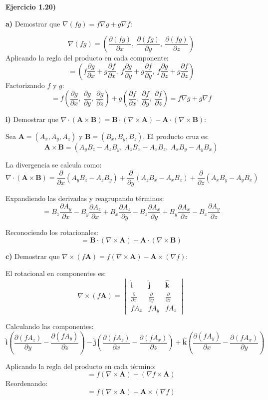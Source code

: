 \documentclass{article}
\begin{document}
\textbf{Ejercicio 1.20)}

\textbf{a)} Demostrar que \(\nabla(fg) = f\nabla g + g\nabla f\):

\[
\nabla(fg) = \left( \frac{\partial(fg)}{\partial x},\ \frac{\partial(fg)}{\partial y},\ \frac{\partial(fg)}{\partial z} \right)
\]
Aplicando la regla del producto en cada componente:
\[
= \left( f\frac{\partial g}{\partial x} + g\frac{\partial f}{\partial x},\ f\frac{\partial g}{\partial y} + g\frac{\partial f}{\partial y},\ f\frac{\partial g}{\partial z} + g\frac{\partial f}{\partial z} \right)
\]
Factorizando \(f\) y \(g\):
\[
= f\left( \frac{\partial g}{\partial x},\ \frac{\partial g}{\partial y},\ \frac{\partial g}{\partial z} \right) + g\left( \frac{\partial f}{\partial x},\ \frac{\partial f}{\partial y},\ \frac{\partial f}{\partial z} \right) = f\nabla g + g\nabla f
\]

\textbf{i)} Demostrar que \(\nabla \cdot (\mathbf{A} \times \mathbf{B}) = \mathbf{B} \cdot (\nabla \times \mathbf{A}) - \mathbf{A} \cdot (\nabla \times \mathbf{B})\):

Sea \(\mathbf{A} = (A_x, A_y, A_z)\) y \(\mathbf{B} = (B_x, B_y, B_z)\). El producto cruz es:
\[
\mathbf{A} \times \mathbf{B} = \left( A_y B_z - A_z B_y,\ A_z B_x - A_x B_z,\ A_x B_y - A_y B_x \right)
\]

La divergencia se calcula como:
\[
\nabla \cdot (\mathbf{A} \times \mathbf{B}) = \frac{\partial}{\partial x}(A_y B_z - A_z B_y) + \frac{\partial}{\partial y}(A_z B_x - A_x B_z) + \frac{\partial}{\partial z}(A_x B_y - A_y B_x)
\]

Expandiendo las derivadas y reagrupando términos:
\[
= B_z \frac{\partial A_y}{\partial x} - B_y \frac{\partial A_z}{\partial x} + B_x \frac{\partial A_z}{\partial y} - B_z \frac{\partial A_x}{\partial y} + B_y \frac{\partial A_x}{\partial z} - B_x \frac{\partial A_y}{\partial z}
\]

Reconociendo los rotacionales:
\[
= \mathbf{B} \cdot (\nabla \times \mathbf{A}) - \mathbf{A} \cdot (\nabla \times \mathbf{B})
\]

\textbf{c)} Demostrar que \(\nabla \times (f\mathbf{A}) = f(\nabla \times \mathbf{A}) - \mathbf{A} \times (\nabla f)\):

El rotacional en componentes es:
\[
\nabla \times (f\mathbf{A}) = 
\begin{vmatrix}
\mathbf{\hat{i}} & \mathbf{\hat{j}} & \mathbf{\hat{k}} \\
\frac{\partial}{\partial x} & \frac{\partial}{\partial y} & \frac{\partial}{\partial z} \\
fA_x & fA_y & fA_z
\end{vmatrix}
\]

Calculando las componentes:
\[
\mathbf{\hat{i}} \left( \frac{\partial(fA_z)}{\partial y} - \frac{\partial(fA_y)}{\partial z} \right) - \mathbf{\hat{j}} \left( \frac{\partial(fA_z)}{\partial x} - \frac{\partial(fA_x)}{\partial z} \right) + \mathbf{\hat{k}} \left( \frac{\partial(fA_y)}{\partial x} - \frac{\partial(fA_x)}{\partial y} \right)
\]

Aplicando la regla del producto en cada término:
\[
= f\left( \nabla \times \mathbf{A} \right) + \left( \nabla f \times \mathbf{A} \right)
\]
Reordenando:
\[
= f(\nabla \times \mathbf{A}) - \mathbf{A} \times (\nabla f)
\]
\end{document}
